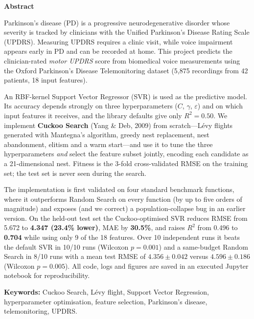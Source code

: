 \documentclass[12pt,a4paper]{article}
\numberwithin{equation}{section}
\numberwithin{table}{section}
\numberwithin{figure}{section}
\begin{document}
\begin{center}{\large\bfseries Abstract}\end{center}

Parkinson's disease (PD) is a progressive neurodegenerative disorder whose severity is tracked by clinicians with the Unified Parkinson's Disease Rating Scale (UPDRS). Measuring UPDRS requires a clinic visit, while voice impairment appears early in PD and can be recorded at home. This project predicts the clinician-rated \emph{motor UPDRS} score from biomedical voice measurements using the Oxford Parkinson's Disease Telemonitoring dataset (5,875 recordings from 42 patients, 18 input features).

An RBF-kernel Support Vector Regressor (SVR) is used as the predictive model. Its accuracy depends strongly on three hyperparameters ($C$, $\gamma$, $\varepsilon$) and on which input features it receives, and the library defaults give only $R^2 = 0.50$. We implement \textbf{Cuckoo Search} (Yang \& Deb, 2009) from scratch---Lévy flights generated with Mantegna's algorithm, greedy nest replacement, nest abandonment, elitism and a warm start---and use it to tune the three hyperparameters \emph{and} select the feature subset jointly, encoding each candidate as a 21-dimensional nest. Fitness is the 3-fold cross-validated RMSE on the training set; the test set is never seen during the search.

The implementation is first validated on four standard benchmark functions, where it outperforms Random Search on every function (by up to five orders of magnitude) and exposes (and we correct) a population-collapse bug in an earlier version. On the held-out test set the Cuckoo-optimised SVR reduces RMSE from 5.672 to \textbf{4.347 (23.4\% lower)}, MAE by \textbf{30.5\%}, and raises $R^2$ from 0.496 to \textbf{0.704} while using only 9 of the 18 features. Over 10 independent runs it beats the default SVR in 10/10 runs (Wilcoxon $p = 0.001$) and a same-budget Random Search in 8/10 runs with a mean test RMSE of $4.356 \pm 0.042$ versus $4.596 \pm 0.186$ (Wilcoxon $p = 0.005$). All code, logs and figures are saved in an executed Jupyter notebook for reproducibility.

\vspace{0.3cm}
\noindent\textbf{Keywords:} Cuckoo Search, Lévy flight, Support Vector Regression, hyperparameter optimisation, feature selection, Parkinson's disease, telemonitoring, UPDRS.
\end{document}
